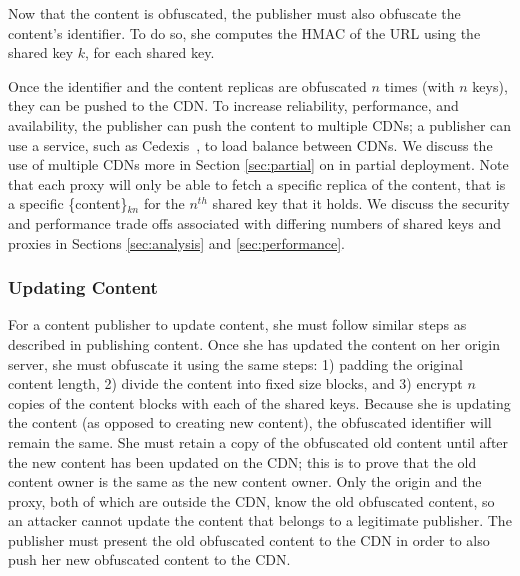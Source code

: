 Now that the content is obfuscated, the publisher must also obfuscate the content's identifier.  To do so, 
she computes the HMAC of the URL using the shared key $k$, for each shared key.

Once the identifier and the content replicas are obfuscated $n$ times (with $n$ keys), they can be pushed to the 
CDN.  To increase reliability, performance, and availability, the publisher can push the content to 
multiple CDNs; a publisher can use a service, such as Cedexis~\cite{cedexis}, to load balance between 
CDNs.  We discuss the use of multiple CDNs more in Section \ref{sec:partial} on \system{} in 
partial deployment.  Note that each proxy will only be able to fetch a specific replica of the content, that is a 
specific \{content\}$_{kn}$ for the $n^{th}$ shared key that it holds.  We discuss the security and performance trade offs 
associated with differing numbers of shared keys and proxies in Sections \ref{sec:analysis} and \ref{sec:performance}.


\subsubsection{Updating Content}
For a content publisher to update content, she must follow similar steps as described in publishing content.  
Once she has updated the content on her origin server, she must obfuscate it using the same steps: 1) padding the 
original content length, 2) divide the content into fixed size blocks, and 3) encrypt $n$ copies of the content blocks 
with each of the shared keys.  Because she is updating the content (as opposed to creating new content), the 
obfuscated identifier will remain the same.  She must 
retain a copy of the obfuscated old content until after the new content has been updated on the CDN; this is to prove 
that the old content owner is the same as the new content owner.  Only the origin and the proxy, both of which are 
outside the CDN, know the old obfuscated content, so an attacker cannot update the content that belongs to 
a legitimate publisher.  The publisher must present the old obfuscated content to the CDN in order to also push 
her new obfuscated content to the CDN. 

